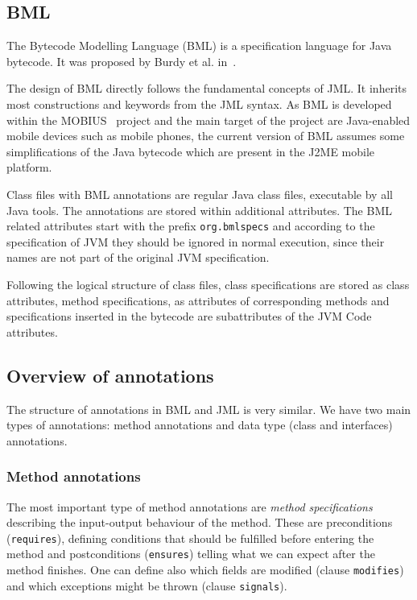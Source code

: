 \documentclass{llncs}
\begin{document}
\subsection{BML}

\vspace*{-0.5\baselineskip}

The Bytecode Modelling Language (BML) is a specification language for
Java bytecode. It was proposed by Burdy et al. in~\cite{bmlBurdy}.\

The
design of BML directly follows the fundamental concepts of JML. It
inherits most constructions and keywords from the JML syntax. As 
BML is developed within the MOBIUS~\cite{mobius} project and the main
target of the project are Java-enabled mobile devices such as mobile
phones, the current version of BML assumes some simplifications of the
Java bytecode which are present in the J2ME mobile platform.

Class files with BML annotations are regular Java class files,
executable by all Java tools. The annotations are stored within
additional attributes. The BML related attributes start with the
prefix \texttt{org.bmlspecs} and according to the specification of JVM
they should be ignored in normal execution, since their names are not part
of the original JVM specification.

Following the logical structure of class files, class
specifications are stored as class attributes, method specifications,
as attributes of corresponding methods and specifications inserted in
the bytecode are subattributes of the JVM Code attributes.

\vspace{-0.5\baselineskip}

\subsection{Overview of annotations}

\vspace{-0.5\baselineskip}

The structure of annotations in BML and JML is very similar. We have
two main types of annotations: method annotations and data type (class
and interfaces) annotations.

\vspace{-\baselineskip}

\subsubsection{Method annotations}
The most important type of method annotations are \textit{method
specifications} describing the input-output behaviour of the
method. These are preconditions (\texttt{requires}), defining
conditions that should be fulfilled before entering the method and
postconditions (\texttt{ensures}) telling what we can expect after the
method finishes. One can define also which fields are modified (clause
\texttt{modifies}) and which exceptions might be thrown (clause
\texttt{signals}).
\end{document}
